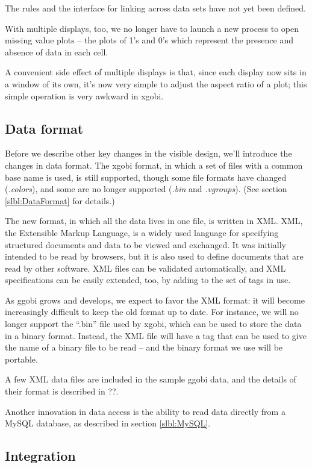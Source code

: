 \documentclass[11pt]{article}
\begin{document}
The rules and the interface for linking across data sets have not yet
been defined.

With multiple displays, too, we no longer have to launch a new
process to open missing value plots -- the plots of 1's and 0's
which represent the presence and absence of data in each cell.

A convenient side effect of multiple displays is that, since each
display now sits in a window of its own, it's now very simple to
adjust the aspect ratio of a plot; this simple operation is very
awkward in xgobi.

\subsection {Data format}

Before we describe other key changes in the visible design, we'll
introduce the changes in data format.  The xgobi format, in which a
set of files with a common base name is used, is still supported,
though some file formats have changed ({\em .colors}), and some are
no longer supported ({\em .bin} and {\em .vgroups}).  (See section
\ref{slbl:DataFormat} for details.)

The new format, in which all the data lives in one file, is written
in XML.  XML, the Extensible Markup Language, is a widely used
language for specifying structured documents and data to be viewed
and exchanged.  It was initially intended to be read by browsers, but
it is also used to define documents that are read by other software.
XML files can be validated automatically, and XML specifications can
be easily extended, too, by adding to the set of tags in use.

As ggobi grows and develops, we expect to favor the XML format:  it
will become increasingly difficult to keep the old format up to
date.  For instance, we will no longer support the ``.bin'' file used
by xgobi, which can be used to store the data in a binary format.
Instead, the XML file will have a tag that can be used to give the
name of a binary file to be read -- and the binary format we use will
be portable.

A few XML data files are included in the sample ggobi data, and
the details of their format is described in ??.

Another innovation in data access is the ability to read data
directly from a MySQL database, as described in section \ref{slbl:MySQL}.

\subsection{Integration}
\end{document}
